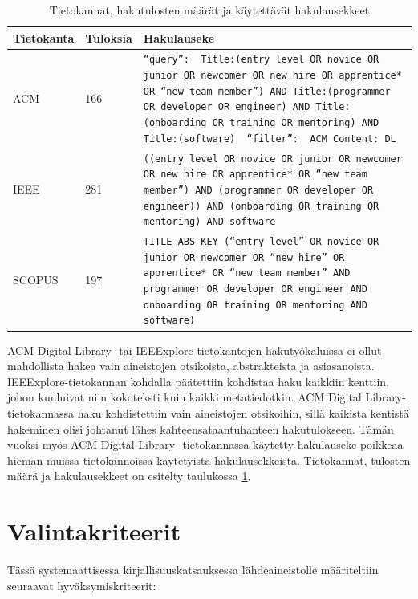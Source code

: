 \documentclass[utf8]{gradu3}
\begin{document}
\begin{table}[h]
    \footnotesize
    \begin{tabular}{llp{}}
        \toprule
        \textbf{Tietokanta} & \textbf{Tuloksia} & \textbf{Hakulauseke} \\
        \midrule
        ACM & 166 & {\tt ``query'': { Title:(entry level OR novice OR junior OR newcomer OR new hire OR apprentice* OR ``new team member'') AND Title:(programmer OR developer OR engineer) AND Title:(onboarding OR training OR mentoring) AND Title:(software) } ``filter'': { ACM Content: DL }  } \\
        \midrule
        IEEE & 281 & {\tt ((entry level OR novice OR junior OR newcomer OR new hire OR apprentice* OR ``new team member'') AND (programmer OR  developer OR engineer)) AND (onboarding OR training OR mentoring) AND software } \\
        \midrule
        SCOPUS & 197 & {\tt TITLE-ABS-KEY (``entry level'' OR novice OR junior OR newcomer OR ``new hire'' OR apprentice* OR ``new team member'' AND programmer OR developer OR engineer  AND onboarding OR training OR mentoring AND software)} \\
        \bottomrule
    \end{tabular}  
    \caption{Tietokannat, hakutulosten määrät ja käytettävät hakulausekkeet}
    \label{tbl:tietokannat}
\end{table}

ACM Digital Library- tai IEEExplore-tietokantojen hakutyökaluissa ei ollut mahdollista hakea vain aineistojen otsikoista, abstrakteista ja asiasanoista. IEEExplore-tietokannan kohdalla päätettiin kohdistaa haku kaikkiin kenttiin, johon kuuluivat niin kokoteksti kuin kaikki metatiedotkin. ACM Digital Library-tietokannassa haku kohdistettiin vain aineistojen otsikoihin, sillä kaikista kentistä hakeminen olisi johtanut lähes kahteensataantuhanteen hakutulokseen. Tämän vuoksi myös ACM Digital Library -tietokannassa käytetty hakulauseke poikkeaa hieman muissa tietokannoissa käytetyistä hakulausekkeista. Tietokannat, tulosten määrä ja hakulausekkeet on esitelty taulukossa \ref{tbl:tietokannat}.

\section{Valintakriteerit}

Tässä systemaattisessa kirjallisuuskatsauksessa lähdeaineistolle määriteltiin seuraavat hyväksymiskriteerit:
\end{document}

